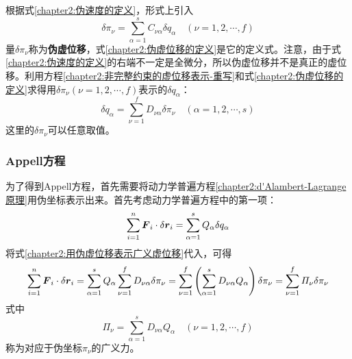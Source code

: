 根据式\eqref{chapter2:伪速度的定义}，形式上引入
\begin{equation}
	\delta \pi_\nu = \sum_{\alpha=1}^s C_{\nu\alpha}\delta q_\alpha \quad (\nu=1,2,\cdots,f)
	\label{chapter2:伪虚位移的定义}
\end{equation}
量$\delta \pi_\nu$称为{\bf 伪虚位移}，式\eqref{chapter2:伪虚位移的定义}是它的定义式。注意，由于式\eqref{chapter2:伪速度的定义}的右端不一定是全微分，所以伪虚位移并不是真正的虚位移。利用方程\eqref{chapter2:非完整约束的虚位移表示-重写}和式\eqref{chapter2:伪虚位移的定义}求得用$\delta\pi_\nu(\nu=1,2,\cdots,f)$表示的$\delta q_\alpha$：
\begin{equation}
	\delta q_\alpha = \sum_{\nu=1}^f D_{\nu\alpha}\delta \pi_\nu\quad (\alpha=1,2,\cdots,s)
	\label{chapter2:用伪虚位移表示广义虚位移}
\end{equation}
这里的$\delta\pi_\nu$可以任意取值。

\subsubsection{Appell方程}

为了得到Appell方程，首先需要将动力学普遍方程\eqref{chapter2:d'Alambert-Lagrange原理}用伪坐标表示出来。首先考虑动力学普遍方程中的第一项：
\begin{equation}
	\sum_{i=1}^n \boldsymbol{F}_i\cdot \delta\boldsymbol{r}_i = \sum_{\alpha=1}^s Q_\alpha\delta q_\alpha
\end{equation}
将式\eqref{chapter2:用伪虚位移表示广义虚位移}代入，可得
\begin{equation}
	\sum_{i=1}^n \boldsymbol{F}_i\cdot \delta\boldsymbol{r}_i = \sum_{\alpha=1}^s Q_\alpha \sum_{\nu=1}^f D_{\nu\alpha}\delta \pi_\nu = \sum_{\nu=1}^f \left(\sum_{\alpha=1}^s D_{\nu\alpha}Q_\alpha\right) \delta \pi_\nu = \sum_{\nu=1}^f \varPi_\nu \delta\pi_\nu
	\label{chapter2:伪坐标下的动力学普遍方程-第一部分}
\end{equation}
式中
\begin{equation}
	\varPi_\nu = \sum_{\alpha=1}^s D_{\nu\alpha}Q_\alpha\quad (\nu = 1,2,\cdots,f)
	\label{chapter3:对应于伪坐标的广义力}
\end{equation}
称为对应于伪坐标$\pi_\nu$的广义力。

